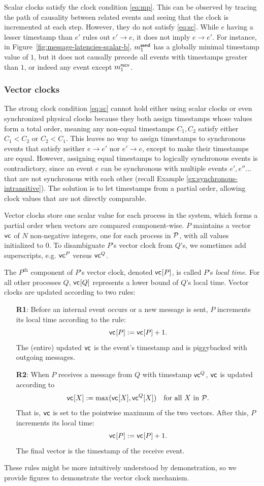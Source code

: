 \documentclass[]             %
{NASA}                       %
\theoremstyle{definition}
\begin{document}
Scalar clocks satisfy the clock condition \eqref{eq:mp}. This can be
observed by tracing the path of causality between related events and
seeing that the clock is incremented at each step. However, they do
not satisfy \eqref{eq:sc}.  While $e$ having a lesser timestamp than
$e'$ rules out $e' \to e$, it does not imply $e \to e'$. For instance,
in Figure~\ref{fig:message-latencies-scalar-b}, $m_{1}^{\mathsf{send}}$ has a
globally minimal timestamp value of $1$, but it does not causally
precede all events with timestamps greater than $1$, or indeed any
event except $m_{1}^{\mathsf{recv}}$.

\subsubsection{Vector clocks}
\label{sssec:vector-clocks}
The strong clock condition \eqref{eq:sc} cannot hold either using
scalar clocks or even synchronized physical clocks because they both
assign timestamps whose values form a total order, meaning any
non-equal timestamps $C_1, C_2$ satisfy either $C_1 < C_2$ or
$C_2 < C_1$. This leaves no way to assign timestamps to synchronous
events that satisfy neither $e \to e'$ nor $e' \to e$, except to make
their timestamps are equal. However, assigning equal timestamps to
logically synchronous events is contradictory, since an event $e$ can
be synchronous with multiple events $e', e''\ldots$ that are not
synchronous with each other (recall Example
\ref{ex:synchronous-intransitive}). The solution is to let timestamps
from a partial order, allowing clock values that are not directly
comparable.

Vector clocks store one scalar value for each process in the system,
which forms a partial order when vectors are compared
component-wise. $P$ maintains a vector $\mathsf{vc}^{}$ of $N$ non-negative
integers, one for each process in $\mathcal{P}$, with all values
initialized to $0$. To disambiguate $P$'s vector clock from $Q$'s, we
sometimes add superscripts, e.g. $\mathsf{vc}^{P}$ versus $\mathsf{vc}^{Q}$.

The $P^\textrm{th}$ component of $P$'s vector clock, denoted
$\mathsf{vc}^{}[P]$, is called $P$'s \emph{local time}. For all other processes
$Q$, $\mathsf{vc}^{}[Q]$ represents a lower bound of $Q$'s local time. Vector
clocks are updated according to two rules:
\begin{enumerate}
\item[\textbf{R1}:] Before an internal event occurs or a new message is sent, $P$
  increments its local time according to the rule:
  \[\mathsf{vc}^{}[P] := \mathsf{vc}^{}[P] + 1.\]
  The (entire) updated $\mathsf{vc}^{}$ is the event's timestamp and is piggybacked with outgoing messages.
\item[\textbf{R2}:] When $P$ receives a message from $Q$ with timestamp
  $\mathsf{vc}^{Q}$, $\mathsf{vc}^{}$ is updated according to
  \[\mathsf{vc}^{}[X] := \max(\mathsf{vc}^{}[X], \mathsf{vc}^{Q}[X]) \quad \textrm{for all $X$ in $\mathcal{P}$}.\]
  That is, $\mathsf{vc}^{}$ is set to the pointwise maximum of the two
  vectors. After this, $P$ increments its local time:
  \[ \mathsf{vc}^{}[P] := \mathsf{vc}^{}[P] + 1.\]
  The final vector is the timestamp of the receive event.
\end{enumerate}
These rules might be more intuitively understood by demonstration, so we provide figures to demonstrate the vector clock mechanism.
\end{document}
